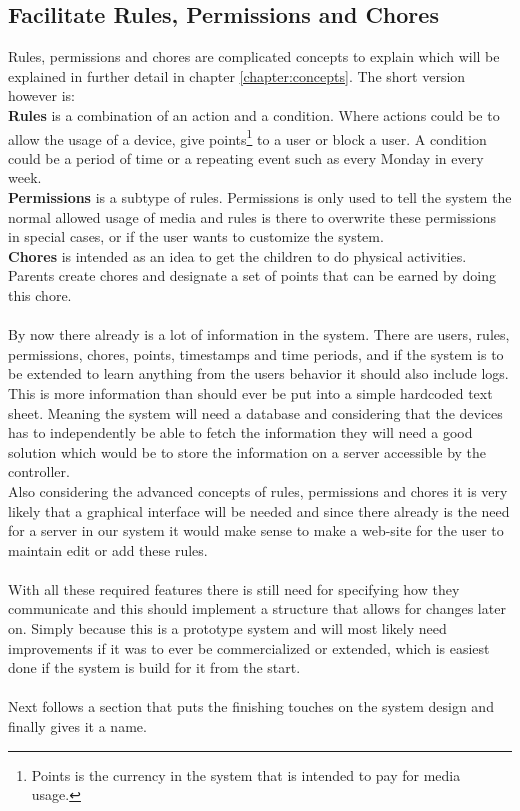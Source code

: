 \subsection{Facilitate Rules, Permissions and Chores}
Rules, permissions and chores are complicated concepts to explain which will be explained in further detail in chapter \ref{chapter:concepts}. The short version however is:\\
\textbf{Rules} is a combination of an action and a condition. Where actions could be to allow the usage of a device, give points\footnote{Points is the currency in the system that is intended to pay for media usage.} to a user or block a user. A condition could be a period of time or a repeating event such as every Monday in every week.\\
\textbf{Permissions} is a subtype of rules. Permissions is only used to tell the system the normal allowed usage of media and rules is there to overwrite these permissions in special cases, or if the user wants to customize the system.\\
\textbf{Chores} is intended as an idea to get the children to do physical activities. Parents create chores and designate a set of points that can be earned by doing this chore.\\
\\
By now there already is a lot of information in the system. There are users, rules, permissions, chores, points, timestamps and time periods, and if the system is to be extended to learn anything from the users behavior it should also include logs.\\
This is more information than should ever be put into a simple hardcoded text sheet. Meaning the system will need a database and considering that the devices has to independently be able to fetch the information they will need a good solution which would be to store the information on a server accessible by the controller.\\
Also considering the advanced concepts of rules, permissions and chores it is very likely that a graphical interface will be needed and since there already is the need for a server in our system it would make sense to make a web-site for the user to maintain edit or add these rules.\\
\\
With all these required features there is still need for specifying how they communicate and this should implement a structure that allows for changes later on. Simply because this is a prototype system and will most likely need improvements if it was to ever be commercialized or extended, which is easiest done if the system is build for it from the start.\\
\\
Next follows a section that puts the finishing touches on the system design and finally gives it a name.


